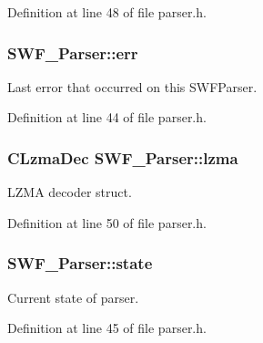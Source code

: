 Definition at line 48 of file parser.\+h.

\hypertarget{struct_s_w_f___parser_a228c1268386d125a52e25b11f576a60d}{}
\subsubsection[{err}]{ S\+W\+F\+\_\+\+Parser\+::err}\label{struct_s_w_f___parser_a228c1268386d125a52e25b11f576a60d}


Last error that occurred on this S\+W\+F\+Parser. 



Definition at line 44 of file parser.\+h.

\hypertarget{struct_s_w_f___parser_a1bbb269f3afac19005232a222d87d054}{}
\subsubsection[{lzma}]{\setlength{\rightskip}{0pt plus 5cm}C\+Lzma\+Dec S\+W\+F\+\_\+\+Parser\+::lzma}\label{struct_s_w_f___parser_a1bbb269f3afac19005232a222d87d054}


L\+Z\+M\+A decoder struct. 



Definition at line 50 of file parser.\+h.

\hypertarget{struct_s_w_f___parser_aeebc37448b1cdf66f228a06a53c483e9}{}
\subsubsection[{state}]{ S\+W\+F\+\_\+\+Parser\+::state}\label{struct_s_w_f___parser_aeebc37448b1cdf66f228a06a53c483e9}


Current state of parser. 



Definition at line 45 of file parser.\+h.

\hypertarget{struct_s_w_f___parser_a89022933c95956b746307de9714197da}{}
